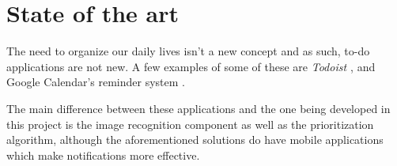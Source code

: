 \chapter{State of the art}
	
	
	The need to organize our daily lives isn't a new concept and as such, to-do applications are not new. A few examples of some of these are \textit{Todoist \cite{todoist}}, and Google Calendar's reminder system \cite{google-calendar}.
	
	The main difference between these applications and the one being developed in this project is the image recognition component as well as the prioritization algorithm, although the aforementioned solutions do have mobile applications which make notifications more effective.
